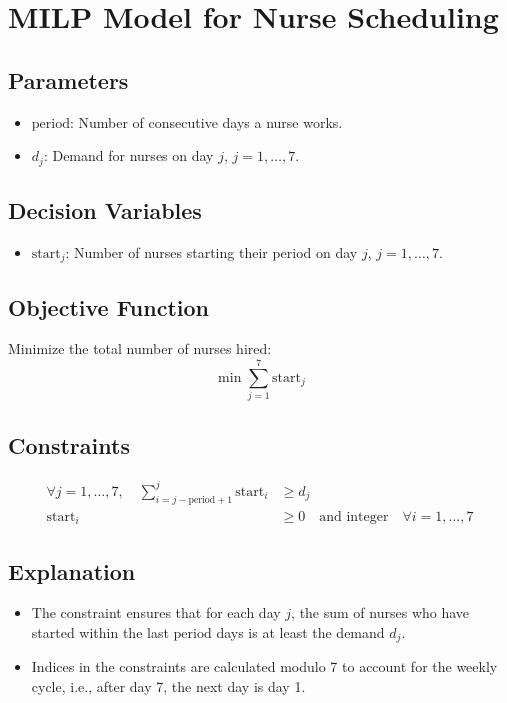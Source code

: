 \documentclass{article}
\begin{document}
\section*{MILP Model for Nurse Scheduling}

\subsection*{Parameters}
\begin{itemize}
    \item \( \text{period} \): Number of consecutive days a nurse works.
    \item \( d_j \): Demand for nurses on day \( j \), \( j = 1, \ldots, 7 \).
\end{itemize}

\subsection*{Decision Variables}
\begin{itemize}
    \item \( \text{start}_j \): Number of nurses starting their period on day \( j \), \( j = 1, \ldots, 7 \).
\end{itemize}

\subsection*{Objective Function}
Minimize the total number of nurses hired:
\[
\min \sum_{j=1}^{7} \text{start}_j
\]

\subsection*{Constraints}
\begin{align*}
\forall j = 1,\ldots,7, \quad \sum_{i=j-\text{period}+1}^{j} \text{start}_i & \geq d_j \\
\text{start}_i & \geq 0 \quad \text{and integer} \quad \forall i = 1,\ldots,7
\end{align*}

\subsection*{Explanation}
\begin{itemize}
    \item The constraint ensures that for each day \( j \), the sum of nurses who have started within the last \( \text{period} \) days is at least the demand \( d_j \).
    \item Indices in the constraints are calculated modulo 7 to account for the weekly cycle, i.e., after day 7, the next day is day 1.
\end{itemize}
\end{document}
